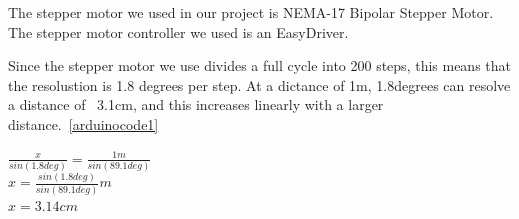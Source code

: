 The stepper motor we used in our project is NEMA-17 Bipolar Stepper Motor. \cite{steppermotor}
The stepper motor controller we used is an EasyDriver.\cite{steppercontroller}



Since the stepper motor we use divides a full cycle into 200 steps, this means that the resolustion is 1.8 degrees per step. At a dictance of 1m, 1.8degrees can resolve a distance of ~3.1cm, and this increases linearly with a larger distance.~\ref{arduinocode1}

$\frac{x}{sin(1.8deg)} = \frac{1m}{sin(89.1deg)}$ \\
$x = \frac{sin(1.8deg)}{sin(89.1deg)}m$ \\
$x = 3.14cm$ \\


